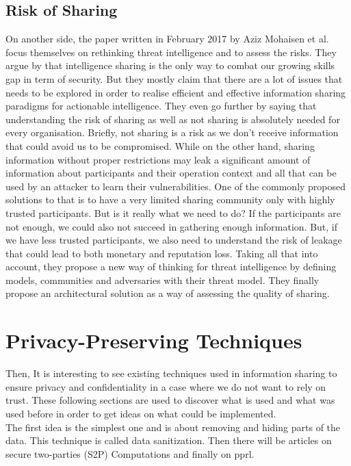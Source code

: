 \documentclass{eplmastersthesis}
\begin{document}
\subsection{Risk of Sharing}
On another side, the paper written in February 2017 by Aziz Mohaisen et al. \cite{mohaisen2017rethinking} focus themselves on rethinking threat intelligence and to assess the risks. They argue by \cite{MalikThreat} that intelligence sharing is the only way to combat our growing skills gap in term of security. But they mostly claim that there are a lot of issues that needs to be explored in order to realise efficient and effective information sharing paradigms for actionable intelligence. They even go further by saying that understanding the risk of sharing as well as not sharing is absolutely needed for every organisation.
Briefly, not sharing is a risk as we don't receive information that could avoid us to be compromised. While on the other hand, sharing information without proper restrictions may leak a significant amount of information about participants and their operation context and all that can be used by an attacker to learn their vulnerabilities.
One of the commonly proposed solutions to that is to have a very limited sharing community only with highly trusted participants. But is it really what we need to do? If the participants are not enough, we could also not succeed in gathering enough information.
But, if we have less trusted participants, we also need to understand the risk of leakage that could lead to both monetary and reputation loss. Taking all that into account, they propose a new way of thinking for threat intelligence by defining models, communities and adversaries with their threat model.
They finally propose an architectural solution as a way of assessing the quality of sharing.

\section{Privacy-Preserving Techniques}
Then, It is interesting to see existing techniques used in information sharing to ensure privacy and confidentiality in a case where we do not want to rely on trust. These following sections are used to discover what is used and what was used before in order to get ideas on what could be implemented.\\

The first idea is the simplest one and is about removing and hiding parts of the data. This technique is called data sanitization. Then there will be articles on secure two-parties (S2P) Computations and finally on \gls{pprl}.\\
\end{document}
